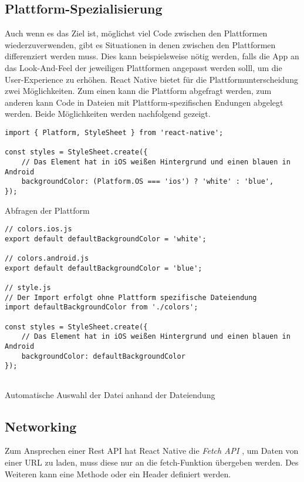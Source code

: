 \subsection{Plattform-Spezialisierung}
Auch wenn es das Ziel ist, möglichst viel Code zwischen den Plattformen wiederzuverwenden, gibt es Situationen in denen zwischen den Plattformen differenziert werden muss. Dies kann beispielsweise nötig werden, falls die App an das Look-And-Feel der jeweiligen Plattformen angepasst werden solll, um die User-Experience zu erhöhen.
React Native bietet für die Plattformunterscheidung zwei Möglichkeiten. Zum einen kann die Plattform abgefragt werden, zum anderen kann Code in Dateien mit Plattform-spezifischen Endungen abgelegt werden. Beide Möglichkeiten werden nachfolgend gezeigt.

\begin{listing}[H]
    \begin{verbatim}
import { Platform, StyleSheet } from 'react-native';

const styles = StyleSheet.create({
    // Das Element hat in iOS weißen Hintergrund und einen blauen in Android
    backgroundColor: (Platform.OS === 'ios') ? 'white' : 'blue',
});
    \end{verbatim}
    \caption{Abfragen der Plattform}
    \label{lst:platform_os}
\end{listing}

\begin{listing}[H]
    \begin{verbatim}
// colors.ios.js
export default defaultBackgroundColor = 'white';

// colors.android.js
export default defaultBackgroundColor = 'blue';
 
// style.js
// Der Import erfolgt ohne Plattform spezifische Dateiendung
import defaultBackgroundColor from './colors';
 
const styles = StyleSheet.create({
    // Das Element hat in iOS weißen Hintergrund und einen blauen in Android
    backgroundColor: defaultBackgroundColor
});
     
    \end{verbatim}
    \caption{Automatische Auswahl der Datei anhand der Dateiendung}
    \label{lst:platform_file}
\end{listing}

\subsection{Networking}
Zum Ansprechen einer Rest API hat React Native die \textit{Fetch API} \cite{facebook_inc._fetch_2017}, um Daten von einer URL zu laden, muss diese nur an die fetch-Funktion übergeben werden. Des Weiteren kann eine Methode oder ein Header definiert werden. 


